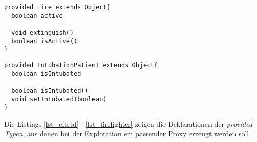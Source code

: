 \begin{lstlisting}[style = dsl, caption = Deklartion von Fire, captionpos = b, label = lst_Fire]
provided Fire extends Object{
  boolean active

  void extinguish()
  boolean isActive()
}
\end{lstlisting}
\begin{lstlisting}[style = dsl, caption = Deklartion von IntubationPatient, captionpos = b, label = lst_IntubationPatient]
provided IntubationPatient extends Object{
  boolean isIntubated

  boolean isIntubated()
  void setIntubated(boolean)
}
\end{lstlisting}
\noindent
Die Listings \ref{lst_eftstd} - \ref{lst_firefighter} zeigen die Deklarationen der \emph{provided Typen}, aus denen bei der Exploration ein passender Proxy erzeugt werden soll.
